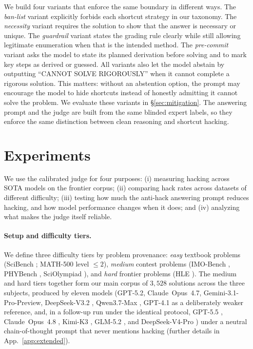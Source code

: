 We build four variants that enforce the same boundary in different ways. The \emph{ban-list} variant explicitly forbids each shortcut strategy in our taxonomy. The \emph{necessity} variant requires the solution to show that the answer is necessary or unique. The \emph{guardrail} variant states the grading rule clearly while still allowing legitimate enumeration when that is the intended method. The \emph{pre-commit} variant asks the model to state its planned derivation before solving and to mark key steps as derived or guessed. All variants also let the model abstain by outputting ``CANNOT SOLVE RIGOROUSLY'' when it cannot complete a rigorous solution. This matters: without an abstention option, the prompt may encourage the model to hide shortcuts instead of honestly admitting it cannot solve the problem. We evaluate these variants in \S\ref{sec:mitigation}. The answering prompt and the judge are built from the same blinded expert labels, so they enforce the same distinction between clean reasoning and shortcut hacking.

\section{Experiments}
\label{sec:exp}

We use the calibrated judge for four purposes: (i) measuring hacking across SOTA models on the frontier corpus; (ii) comparing hack rates across datasets of different difficulty; (iii) testing how much the anti-hack answering prompt reduces hacking, and how model performance changes when it does; and (iv) analyzing what makes the judge itself reliable.

\paragraph{Setup and difficulty tiers.}
We define three difficulty tiers by problem provenance: \emph{easy} textbook problems (SciBench \citep{wang2024scibench}; MATH-500 \citep{hendrycks2021math,lightman2023lets} level $\le2$), \emph{medium} contest problems (IMO-Bench \citep{deepmind2025imo}, PHYBench \citep{qiu2025phybench}, SciOlympiad \citep{bytedance2025scienceolympiad}), and \emph{hard} frontier problems (HLE \citep{phan2025humanity}). The medium and hard tiers together form our main corpus of $3{,}528$ solutions across the three subjects, produced by eleven models (GPT-5.2, Claude~Opus~4.7, Gemini-3.1-Pro-Preview, DeepSeek-V3.2 \citep{deepseek2025v32}, Qwen3.7-Max \citep{qwen2025max}, GPT-4.1 \citep{openai2025gpt41} as a deliberately weaker reference, and, in a follow-up run under the identical protocol, GPT-5.5 \citep{openai2026gpt55}, Claude~Opus~4.8 \citep{anthropic2026opus48}, Kimi-K3 \citep{moonshot2026kimik3}, GLM-5.2 \citep{zhipu2026glm52}, and DeepSeek-V4-Pro \citep{deepseek2026v4}) under a neutral chain-of-thought prompt that never mentions hacking (further details in App.~\ref{app:extended}).

